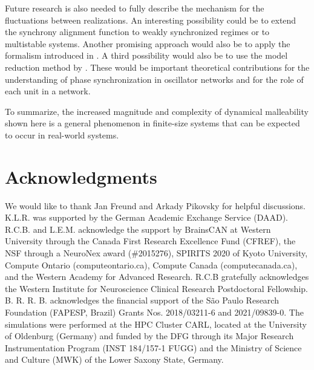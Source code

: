 Future research is also needed to fully describe the mechanism for the fluctuations between realizations. An interesting possibility could be to extend the synchrony alignment function \cite{skardal2014optimal} to weakly synchronized regimes or to multistable systems. Another promising approach would also be to apply the formalism introduced in \cite{muller2021algebraic,budzinski2022geometry}. A third possibility would also be to use the model reduction method by \cite{hancock2018model}. These would be important theoretical contributions for the understanding of phase synchronization in oscillator networks and for the role of each unit in a network.

To summarize, the increased magnitude and complexity of dynamical malleability shown here is a general phenomenon in finite-size systems that can be expected to occur in real-world systems. 


\section*{Acknowledgments}
We would like to thank Jan Freund and Arkady Pikovsky for helpful discussions. K.L.R. was supported by the German Academic Exchange Service (DAAD). R.C.B. and L.E.M. acknowledge the support by BrainsCAN at Western University through the Canada First Research Excellence Fund (CFREF), the NSF through a NeuroNex award (\#2015276), SPIRITS 2020 of Kyoto University, Compute Ontario (computeontario.ca), Compute Canada (computecanada.ca), and the Western Academy for Advanced Research. R.C.B gratefully acknowledges the Western Institute for Neuroscience Clinical Research Postdoctoral Fellowship. B. R. R. B. acknowledges the financial support of the São Paulo Research Foundation (FAPESP, Brazil) Grants Nos. 2018/03211-6 and 2021/09839-0. The simulations were performed at the HPC Cluster CARL, located at the University of Oldenburg (Germany) and funded by the DFG through its Major Research Instrumentation Program (INST 184/157-1 FUGG) and the Ministry of Science and Culture (MWK) of the Lower Saxony State, Germany.

